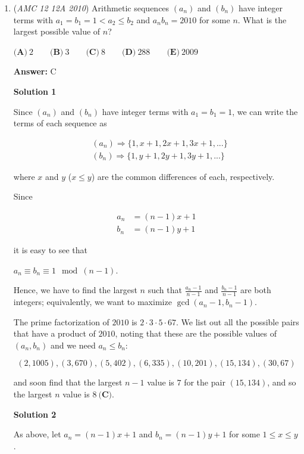 \begin{enumerate}
 


	\item (\textit{AMC 12 12A 2010}) Arithmetic sequences $\left(a_n\right)$ and $\left(b_n\right)$ have integer terms with $a_1=b_1=1<a_2 \le b_2$ and $a_n b_n = 2010$ for some $n$. What is the largest possible value of $n$?


 $\textbf{(A)}\ 2 \qquad \textbf{(B)}\ 3 \qquad \textbf{(C)}\ 8 \qquad \textbf{(D)}\ 288 \qquad \textbf{(E)}\ 2009$

 \textbf{Answer: }C



\textbf{Solution 1}

Since $\left(a_n\right)$ and $\left(b_n\right)$ have integer terms with $a_1=b_1=1$, we can write the terms of each sequence as

 
 \begin{align*}&\left(a_n\right) \Rightarrow \{1, x+1, 2x+1, 3x+1, ...\}\\ &\left(b_n\right) \Rightarrow \{1, y+1, 2y+1, 3y+1, ...\}\end{align*}


 where $x$ and $y$ ($x\leq y$) are the common differences of each, respectively.

 
Since

 
 \begin{align*}a_n &= (n-1)x+1\\ b_n &= (n-1)y+1\end{align*}


 it is easy to see that

 $a_n \equiv b_n \equiv 1 \mod{(n-1)}$.

 
Hence, we have to find the largest $n$ such that $\frac{a_n-1}{n-1}$ and $\frac{b_n-1}{n-1}$ are both integers; equivalently, we want to maximize $\gcd(a_n-1, b_n-1)$.

 
The prime factorization of $2010$ is $2\cdot{3}\cdot{5}\cdot{67}$. We list out all the possible pairs that have a product of $2010$, noting that these are the possible values of $(a_n, b_n)$ and we need $a_n \leq b_n$:

 
 \[(2,1005), (3, 670), (5,402), (6,335), (10,201),(15,134),(30,67)\]

 and soon find that the largest $n-1$ value is $7$ for the pair $(15, 134)$, and so the largest $n$ value is $\boxed{8\ \textbf{(C)}}$.

 



\textbf{Solution 2}

As above, let $a_n=(n-1)x+1$ and $b_n=(n-1)y+1$ for some $1\leq x\leq y$.


\end{enumerate}

